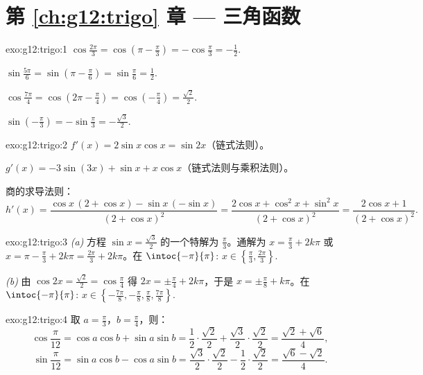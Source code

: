 \section*{第 \ref{ch:g12:trigo} 章 --- 三角函数}

\begin{solution}{exo:g12:trigo:1}
$\cos\frac{2\pi}{3} = \cos\left(\pi - \frac\pi3\right) = -\cos\frac\pi3
= -\frac12$.

$\sin\frac{5\pi}{6} = \sin\left(\pi - \frac\pi6\right) = \sin\frac\pi6
= \frac12$.

$\cos\frac{7\pi}{4} = \cos\left(2\pi - \frac{\pi}{4}\right)
= \cos\left(-\frac\pi4\right) = \frac{\sqrt2}{2}$.

$\sin\left(-\frac\pi3\right) = -\sin\frac\pi3 = -\frac{\sqrt3}{2}$.
\end{solution}

\begin{solution}{exo:g12:trigo:2}
$f'(x) = 2\sin x\cos x = \sin 2x$（链式法则）。

$g'(x) = -3\sin(3x) + \sin x + x\cos x$（链式法则与乘积法则）。

商的求导法则：
\[
h'(x) = \frac{\cos x\,(2 + \cos x) - \sin x\,(-\sin x)}{(2+\cos x)^2}
= \frac{2\cos x + \cos^2 x + \sin^2 x}{(2+\cos x)^2}
= \frac{2\cos x + 1}{(2+\cos x)^2}.
\]
\end{solution}

\begin{solution}{exo:g12:trigo:3}
\emph{(a)} 方程 $\sin x = \frac{\sqrt3}{2}$ 的一个特解为
$\frac\pi3$。通解为 $x = \frac\pi3 + 2k\pi$ 或
$x = \pi - \frac\pi3 + 2k\pi = \frac{2\pi}{3} + 2k\pi$。在
$\intoc{-\pi}{\pi}$: $x \in \left\{\frac\pi3, \frac{2\pi}{3}\right\}$.

\emph{(b)} 由 $\cos 2x = \frac{\sqrt2}{2} = \cos\frac\pi4$ 得
$2x = \pm\frac\pi4 + 2k\pi$，于是 $x = \pm\frac\pi8 + k\pi$。在
$\intoc{-\pi}{\pi}$:
$x \in \left\{-\frac{7\pi}{8}, -\frac\pi8, \frac\pi8, \frac{7\pi}{8}\right\}$.
\end{solution}

\begin{solution}{exo:g12:trigo:4}
取 $a = \frac\pi3$，$b = \frac\pi4$，则：
\[
\cos\frac{\pi}{12} = \cos a\cos b + \sin a \sin b
= \frac12\cdot\frac{\sqrt2}{2} + \frac{\sqrt3}{2}\cdot\frac{\sqrt2}{2}
= \frac{\sqrt2 + \sqrt6}{4},
\]
\[
\sin\frac{\pi}{12} = \sin a\cos b - \cos a \sin b
= \frac{\sqrt3}{2}\cdot\frac{\sqrt2}{2} - \frac12\cdot\frac{\sqrt2}{2}
= \frac{\sqrt6 - \sqrt2}{4}.
\]
\end{solution}

